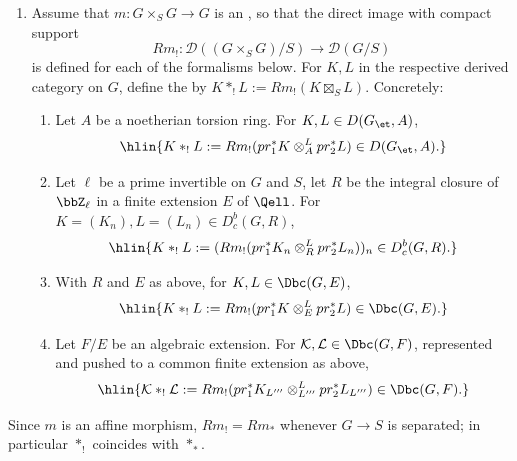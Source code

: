 \begin{definition}
\begin{enumerate}
\begin{enumerate}
            \item Let $F/E$ be an algebraic extension. For $\mathcal{K}, \mathcal{L} \in \Dbc(G,F)$ (), represented by $K_{L'}, L_{L''}$ for finite subextensions, push both to a common finite extension and define
            $$\hlin{\mathcal{K} *_* \mathcal{L} := Rm_*(pr_1^* K_{L'''} \otimes_{L'''}^L pr_2^* L_{L'''}) \in \Dbc(G,F).}$$
        \end{enumerate}

        \item Assume that $m: G \times_S G \to G$ is an , so that the direct image with compact support
        $$Rm_!: \mathcal{D}((G \times_S G)/S) \to \mathcal{D}(G/S)$$
        is defined for each of the formalisms below. For $K, L$ in the respective derived category on $G$, define the  by $K *_! L := Rm_!(K \boxtimes_S L)$. Concretely:
        \begin{enumerate}
            \item Let $A$ be a noetherian torsion ring. For $K, L \in D(G_{\et}, A)$,
            $$\hlin{K *_! L := Rm_!(pr_1^* K \otimes_A^L pr_2^* L) \in D(G_{\et}, A).}$$

            \item Let $\ell$ be a prime invertible on $G$ and $S$, let $R$ be the integral closure of $\bbZ_\ell$ in a finite extension $E$ of $\Qell$. For $K = (K_n), L = (L_n) \in D_c^b(G,R)$,
            $$\hlin{K *_! L := (Rm_!(pr_1^* K_n \otimes_R^L pr_2^* L_n))_n \in D_c^b(G,R).}$$

            \item With $R$ and $E$ as above, for $K, L \in \Dbc(G,E)$,
            $$\hlin{K *_! L := Rm_!(pr_1^* K \otimes_E^L pr_2^* L) \in \Dbc(G,E).}$$

            \item Let $F/E$ be an algebraic extension. For $\mathcal{K}, \mathcal{L} \in \Dbc(G,F)$, represented and pushed to a common finite extension as above,
            $$\hlin{\mathcal{K} *_! \mathcal{L} := Rm_!(pr_1^* K_{L'''} \otimes_{L'''}^L pr_2^* L_{L'''}) \in \Dbc(G,F).}$$
        \end{enumerate}
    \end{enumerate}

    Since $m$ is an affine morphism, $Rm_! = Rm_*$ whenever $G \to S$ is separated; in particular $*_!$ coincides with $*_*$.
\end{definition}
